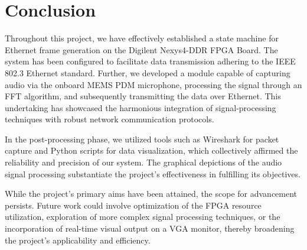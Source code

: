 
\section{Conclusion}

Throughout this project, we have effectively established a state machine for Ethernet frame generation on the Digilent Nexys4-DDR FPGA Board. The system has been configured to facilitate data transmission adhering to the IEEE 802.3 Ethernet standard. Further, we developed a module capable of capturing audio via the onboard MEMS PDM microphone, processing the signal through an FFT algorithm, and subsequently transmitting the data over Ethernet. This undertaking has showcased the harmonious integration of signal-processing techniques with robust network communication protocols.

In the post-processing phase, we utilized tools such as Wireshark for packet capture and Python scripts for data visualization, which collectively affirmed the reliability and precision of our system. The graphical depictions of the audio signal processing substantiate the project's effectiveness in fulfilling its objectives.

While the project's primary aims have been attained, the scope for advancement persists. Future work could involve optimization of the FPGA resource utilization, exploration of more complex signal processing techniques, or the incorporation of real-time visual output on a VGA monitor, thereby broadening the project's applicability and efficiency.
